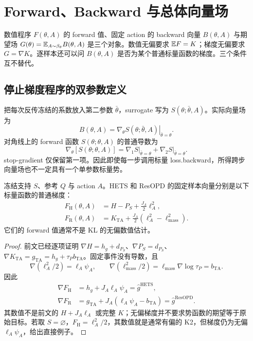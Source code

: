 \section{Forward、Backward 与总体向量场}
\label{est:fields}

数值程序 $F(\theta,A)$ 的 forward 值、固定 action 的 backward 向量 $B(\theta,A)$ 与期望场 $G(\theta)=\mathbb E_{A\sim\beta_\theta}B(\theta,A)$ 是三个对象。数值无偏要求 $\mathbb E F=K$；梯度无偏要求 $G=\nabla K$。逐样本还可以问 $B(\theta,A)$ 是否为某个普通标量函数的梯度。三个条件互不替代。

\subsection{停止梯度程序的双参数定义}
\label{est:two-parameter}
把每次反传冻结的系数放入第二参数 $\bar\theta$，surrogate 写为 $S(\theta;\bar\theta,A)$。实际向量场为
\begin{equation}
B(\theta,A)=\left.\nabla_\theta S(\theta;\bar\theta,A)\right|_{\bar\theta=\theta}.
\end{equation}
对角线上的 forward 函数 $S(\theta;\theta,A)$ 的普通导数为
\begin{equation}
\nabla_\theta[S(\theta;\theta,A)]
=\left.\nabla_1S\right|_{\bar\theta=\theta}
+\left.\nabla_2S\right|_{\bar\theta=\theta}.
\end{equation}
stop-gradient 仅保留第一项。因此即使每一步调用标量 loss.backward，所得跨步向量场也不一定具有一个单参数标量势。

\begin{proposition}
\label{est:sample-potentials}
冻结支持 $S$、参考 $Q$ 与 action $A$。HETS 和 ResOPD 的固定样本向量分别是以下标量函数的普通梯度：
\begin{align}
F_{\mathrm H}(\theta,A)&=H-P_S+\frac{J_A}{2}\ell_A^2,\\
F_{\mathrm R}(\theta,A)&=K_{\mathrm{TA}}+\frac{J_A}{2}(\ell_A^2-\ell_{\mathrm{mass}}^2).
\end{align}
它们的 forward 值通常不是 KL 的无偏数值估计。
\end{proposition}
\begin{proof}
前文已经逐项证明 $\nabla H=h_g+d_{P_S}$、$\nabla P_S=d_{P_S}$、$\nabla K_{\mathrm{TA}}=g_{\mathrm{TA}}=h_g+\tau_Pb_{\mathrm{TA}}$。固定事件没有导数，且
\begin{equation}
\nabla(\ell_A^2/2)=\ell_A\psi_A,\qquad
\nabla(\ell_{\mathrm{mass}}^2/2)
=\ell_{\mathrm{mass}}\nabla\log\tau_P=b_{\mathrm{TA}}.
\end{equation}
因此
\begin{align}
\nabla F_{\mathrm H}&=h_g+J_A\ell_A\psi_A=\widehat g^{\mathrm{HETS}},\\
\nabla F_{\mathrm R}&=g_{\mathrm{TA}}+J_A(\ell_A\psi_A-b_{\mathrm{TA}})=\widehat g^{\mathrm{ResOPD}}.
\end{align}
其数值不是前文的 $H+J_A\ell_A$ 或完整 $K$；无偏梯度并不要求势函数的期望等于原始目标。若取 $S=\varnothing$，$F_{\mathrm H}=\ell_A^2/2$，其数值就是通常有偏的 K2，但梯度仍为无偏 $\ell_A\psi_A$，给出直接例子。
\end{proof}


